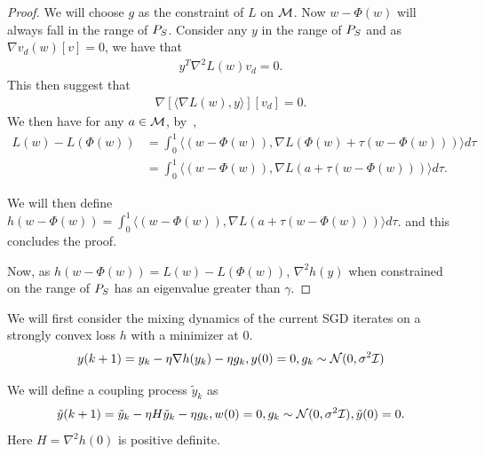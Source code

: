 \begin{proof}
    We will choose $g$ as the constraint of $L$ on $\mathcal{M}$.  Now $w - \Phi(w)$ will always fall in the range of ${P}_S$. Consider any $y$ in the range of ${P}_S$ and as $\nabla v_d(w)[v] = 0$, we have that
    \begin{align*}
        y^T \nabla^2 L(w) v_d = 0.
    \end{align*}
    This then suggest that
    \begin{align*}
        \nabla[ \langle \nabla L(w), y\rangle][v_d] = 0.
    \end{align*}
    We then have for any $a \in \mathcal{M}$, by~,
    \begin{align*}
        L(w) - L(\Phi(w))  &= \int_{0}^{1} \langle (w - \Phi(w)), \nabla L(\Phi(w) + \tau(w - \Phi(w))) \rangle d \tau \\
         &= \int_{0}^{1} \langle (w - \Phi(w)), \nabla L(a + \tau(w - \Phi(w))) \rangle d \tau.
    \end{align*}

    We will then define $h(w - \Phi(w)) =  \int_{0}^{1} \langle (w - \Phi(w)), \nabla L(a + \tau(w - \Phi(w))) \rangle d \tau$. and this concludes the proof.

    Now, as $h(w - \Phi(w)) = L(w) - L(\Phi(w))$, $\nabla^2 h(y)$ when constrained on the range of ${P}_S$ has an eigenvalue greater than $\gamma$.
\end{proof}



We will first consider the mixing dynamics of the current SGD iterates on a strongly convex loss $h$ with a minimizer at $0$.
\begin{align}
\label{eq:sgd-h}
    y(k + 1) = y_k - \eta \nabla h(y_k) - \eta {g}_k, y(0) = 0,{{g}_k} \sim \mathcal{N}(0, \sigma^2 \mathcal{I})
\end{align}


We will define a coupling process $\tilde y_k$ as 
\begin{align}
    \label{eq:sgd-h-gauss}
    \tilde y(k + 1) = \tilde y_k - \eta H \tilde y_k - \eta {g}_k, w(0) = 0, {g}_k \sim \mathcal{N}(0, \sigma^2 \mathcal{I}), \tilde y(0) = 0.
\end{align}
Here $H = \nabla^2 h(0)$ is positive definite.

